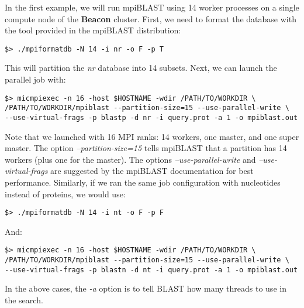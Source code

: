\documentclass[10pt]{article}
\newcommand{\beac}{\textbf{Beacon }}
\begin{document}
In the first example, we will run mpiBLAST using 14 worker processes on a single compute node of the \beac cluster.  First, we need to format the database with the tool provided in the mpiBLAST distribution:
\begin{verbatim}
$> ./mpiformatdb -N 14 -i nr -o F -p T
\end{verbatim}
\noindent This will partition the \emph{nr} database into 14 subsets.  Next, we can launch the parallel job with:
\begin{verbatim}
$> micmpiexec -n 16 -host $HOSTNAME -wdir /PATH/TO/WORKDIR \
/PATH/TO/WORKDIR/mpiblast --partition-size=15 --use-parallel-write \
--use-virtual-frags -p blastp -d nr -i query.prot -a 1 -o mpiblast.out
\end{verbatim}
\noindent Note that we launched with 16 MPI ranks: 14 workers, one master, and one super master.  The option \emph{--partition-size=15} tells mpiBLAST that a partition has 14 workers (plus one for the master).  The options \emph{--use-parallel-write}
and \emph{--use-virtual-frags} are suggested by the mpiBLAST documentation for best performance.  Similarly, if we ran the same job configuration with nucleotides instead of proteins, we would use:
\begin{verbatim}
$> ./mpiformatdb -N 14 -i nt -o F -p F
\end{verbatim}
\noindent And:
\begin{verbatim}
$> micmpiexec -n 16 -host $HOSTNAME -wdir /PATH/TO/WORKDIR \
/PATH/TO/WORKDIR/mpiblast --partition-size=15 --use-parallel-write \
--use-virtual-frags -p blastn -d nt -i query.prot -a 1 -o mpiblast.out
\end{verbatim}
\noindent In the above cases, the \emph{-a} option is to tell BLAST how many threads to use in the search.\\
\end{document}
